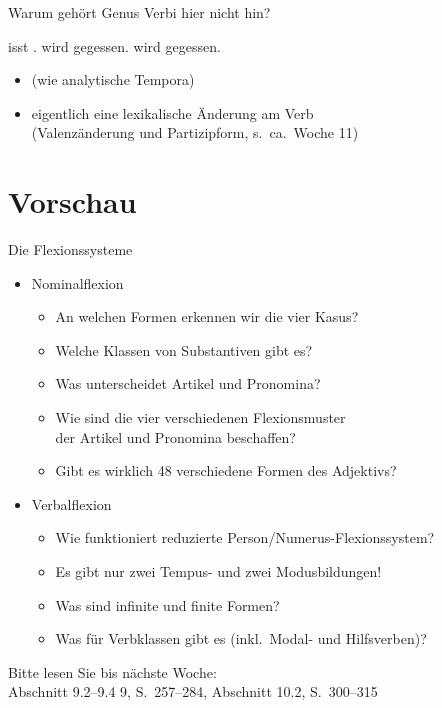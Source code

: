 \begin{frame}
  {Warum gehört Genus Verbi hier nicht hin?}
  \pause
  \begin{exe}
    \ex
    \begin{xlist}
      \ex {} \alert{isst} .
      \pause
      \ex {} \alert{wird} \alert{gegessen}.
      \pause
      \ex {} \alert{wird}  \alert{gegessen}.
    \end{xlist}
  \end{exe}
  \pause
  \Zeile
  \begin{itemize}[<+->]
    \item {} (wie analytische Tempora)
    \item eigentlich eine \alert{lexikalische} Änderung am Verb\\
      (Valenzänderung und Partizipform, s.\ ca.\ Woche 11)
  \end{itemize}
\end{frame}

\section{Vorschau}


\begin{frame}
  {Die Flexionssysteme}
  \pause
  \begin{itemize}[<+->]
    \item \alert{Nominalflexion}
      \begin{itemize}[<+->]
        \item An welchen Formen erkennen wir die vier Kasus?
        \item Welche Klassen von Substantiven gibt es?
        \item Was unterscheidet Artikel und Pronomina?
        \item Wie sind die \alert{vier} verschiedenen Flexionsmuster\\
          der Artikel und Pronomina beschaffen?
        \item Gibt es wirklich 48 verschiedene Formen des Adjektivs?
      \end{itemize}
      \Zeile
    \item \alert{Verbalflexion}
      \begin{itemize}[<+->]
        \item Wie funktioniert reduzierte Person\slash Numerus-Flexionssystem?
        \item Es gibt nur zwei Tempus- und zwei Modusbildungen!
        \item Was sind infinite und finite Formen?
        \item Was für Verbklassen gibt es (inkl.\ Modal- und Hilfsverben)?
      \end{itemize}
  \end{itemize}
  \pause
  \begin{center}
    Bitte lesen Sie bis nächste Woche:\\
    \alert{Abschnitt 9.2--9.4 9, S.~257--284, Abschnitt 10.2, S.~300--315}
  \end{center}
  \pause
  \pause
  \pause
  \pause
  \pause
\end{frame}


